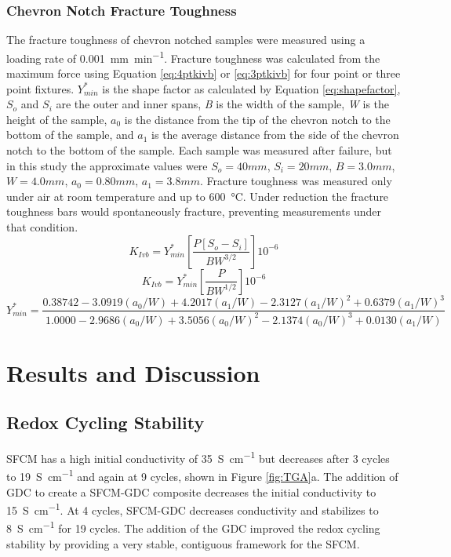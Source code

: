     \subsubsection{Chevron Notch Fracture Toughness}
        The fracture toughness of chevron notched samples were measured using a loading rate of \SI{0.001}{mm\per\minute}.
        Fracture toughness was calculated from the maximum force using Equation \ref{eq:4ptkivb} or \ref{eq:3ptkivb} for four point or three point fixtures.\cite{ASTM2016a,Wu1984}
        $Y^{*}_{min}$ is the shape factor as calculated by Equation \ref{eq:shapefactor}, $S_o$ and $S_i$ are the outer and inner spans, \textit{B} is the width of the sample, \textit{W} is the height of the sample, $a_0$ is the distance from the tip of the chevron notch to the bottom of the sample, and $a_1$ is the average distance from the side of the chevron notch to the bottom of the sample.
        Each sample was measured after failure, but in this study the approximate values were $S_o = 40 mm$, $S_i = 20 mm$, $B = 3.0 mm$, $W = 4.0 mm$, $a_0 = 0.80 mm$, $a_1 = 3.8 mm$.
        Fracture toughness was measured only under air at room temperature and up to \SI{600}{\celsius}.
        Under reduction the fracture toughness bars would spontaneously fracture, preventing measurements under that condition.
        \begin{equation}
            K_{Ivb} = Y^{*}_{min}  \left [\frac{P[S_o-S_i]}{BW^{3/2}}\right ]10^{-6}
            \label{eq:4ptkivb}
        \end{equation}
        \begin{equation}
            K_{Ivb} = Y^{*}_{min}  \left [\frac{P}{BW^{1/2}}\right ]10^{-6}
            \label{eq:3ptkivb}
        \end{equation}
        \begin{equation}
            Y^{*}_{min} = \frac{0.38742-3.0919(a_0/W)+4.2017(a_1/W)-2.3127(a_1/W)^2+0.6379(a_1/W)^3}{1.0000-2.9686(a_0/W)+3.5056(a_0/W)^2-2.1374(a_0/W)^3+0.0130(a_1/W)}
            \label{eq:shapefactor}
        \end{equation}

\section{Results and Discussion}
    \subsection{Redox Cycling Stability}
        SFCM has a high initial conductivity of \SI{35}{S\per\centi\meter} but decreases after 3 cycles to \SI{19}{S\per\centi\meter} and again at 9 cycles, shown in Figure \ref{fig:TGA}a.
        The addition of GDC to create a SFCM-GDC composite decreases the initial conductivity to \SI{15}{S\per\centi\meter}.
        At 4 cycles, SFCM-GDC decreases conductivity and stabilizes to \SI{8}{S\per\centi\meter} for 19 cycles.
        The addition of the GDC improved the redox cycling stability by providing a very stable, contiguous framework for the SFCM.\cite{Mogensen2000,Duncan2006,Bishop2009}

